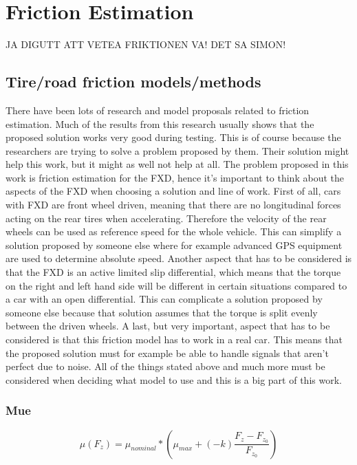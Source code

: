 \chapter{Friction Estimation}

JA DIGUTT ATT VETEA FRIKTIONEN VA! DET SA SIMON!



\section{Tire/road friction models/methods}
There have been lots of research and model proposals related to friction estimation. Much of the results from this research usually shows that the proposed solution works very good during testing. This is of course because the researchers are trying to solve a problem proposed by them. Their solution might help this work, but it might as well not help at all. The problem proposed in this work is friction estimation for the FXD, hence it's important to think about the aspects of the FXD when choosing a solution and line of work. First of all, cars with FXD are front wheel driven, meaning that there are no longitudinal forces acting on the rear tires when accelerating. Therefore the velocity of the rear wheels can be used as reference speed for the whole vehicle. This can simplify a solution proposed by someone else where for example advanced GPS equipment are used to determine absolute speed. Another aspect that has to be considered is that the FXD is an active limited slip differential, which means that the torque on the right and left hand side will be different in certain situations compared to a car with an open differential. This can complicate a solution proposed by someone else because that solution assumes that the torque is split evenly between the driven wheels. A last, but very important, aspect that has to be considered is that this friction model has to work in a real car. This means that the proposed solution must for example be able to handle signals that aren't perfect due to noise. All of the things stated above and much more must be considered when deciding what model to use and this is a big part of this work.

\subsection{Mue}

\begin{equation}
\mu(F_{z})=\mu_{nominal}*(\mu_{max} + (-k)\frac{F_{z} - F_{z_{0}}}{F_{z_{0}}})
\end{equation}

